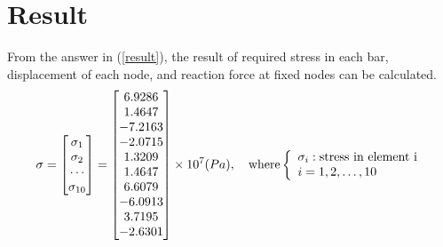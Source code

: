 \documentclass[12pt, a4paper]{article}
\begin{document}
\section{Result}
    \qquad From the answer in (\ref{result}), the result of required stress in each bar, displacement of each node, and reaction force at fixed nodes can be calculated.
    \begin{equation}
    	\mathbf{\sigma}=
        \begin{bmatrix}
        	\sigma_1 \\ \sigma_2 \\ \cdots \\ \sigma_{10}
        \end{bmatrix}
        =
        \begin{bmatrix}
        	6.9286\\    1.4647\\   -7.2163  \\ -2.0715  \\  1.3209  \\  1.4647  \\  6.6079 \\  -6.0913\\ 3.7195   \\-2.6301
        \end{bmatrix}
        \times 10^7 (Pa),\textrm{\quad where}
        \left\{
        \begin{array}{l}
        \sigma_i: \textrm{stress in element i}\\
        i=1,2,\ldots,10
        \end{array}
        \right.
    \end{equation}
\end{document}
